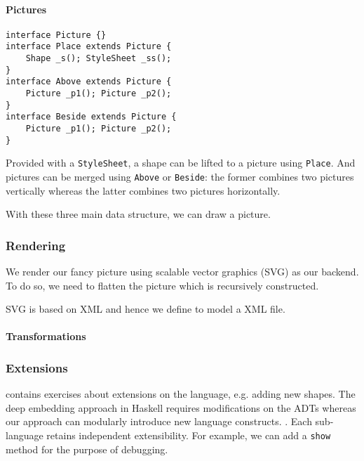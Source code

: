 \paragraph{Pictures}
\begin{lstlisting}
interface Picture {}
interface Place extends Picture {
    Shape _s(); StyleSheet _ss();
}
interface Above extends Picture {
    Picture _p1(); Picture _p2();
}
interface Beside extends Picture {
    Picture _p1(); Picture _p2();
}
\end{lstlisting}

Provided with a \texttt{StyleSheet}, a shape can be lifted to a picture using
\texttt{Place}. And pictures can be merged using \texttt{Above} or
\texttt{Beside}: the former combines two pictures vertically whereas the latter
combines two pictures horizontally.

With these three main data structure, we can draw a picture.

\subsubsection{Rendering}
We render our fancy picture using scalable vector graphics (SVG) as our backend.
To do so, we need to flatten the picture which is recursively constructed.

SVG is based on XML and hence we define to model a XML file.

\paragraph{Transformations}

\subsubsection{Extensions}
\cite{} contains exercises about extensions on the language, e.g.
adding new shapes. The deep embedding approach in Haskell requires modifications on the ADTs
whereas our approach can modularly introduce new language constructs.
.
Each sub-language retains independent extensibility.
For example, we can add a \texttt{show} method for the purpose of debugging.
